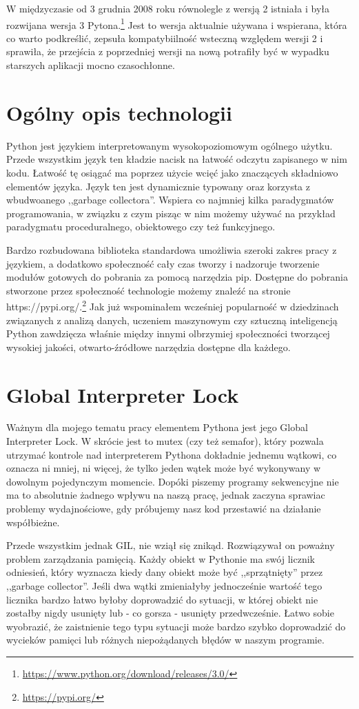 W międzyczasie od 3 grudnia 2008 roku równolegle z wersją 2 istniała i była rozwijana wersja 3 Pytona.\footnote{\url{https://www.python.org/download/releases/3.0/}} Jest to wersja aktualnie używana i wspierana, która co warto podkreślić, zepsuła kompatybiilność wsteczną względem wersji 2 i sprawiła, że przejścia z poprzedniej wersji na nową potrafiły być w wypadku starszych aplikacji mocno czasochłonne. 

\section{Ogólny opis technologii}
Python jest językiem interpretowanym wysokopoziomowym ogólnego użytku. Przede wszystkim język ten kładzie nacisk na łatwość odczytu zapisanego w nim kodu. Łatwość tę osiągać ma poprzez użycie wcięć jako znaczących składniowo elementów języka.  Język ten jest dynamicznie typowany oraz korzysta z wbudwoanego ,,garbage collectora''. Wspiera co najmniej kilka paradygmatów programowania, w związku z czym pisząc w nim możemy używać na przykład paradygmatu proceduralnego, obiektowego czy też funkcyjnego.

Bardzo rozbudowana biblioteka standardowa umożliwia szeroki zakres pracy z językiem, a dodatkowo społeczność cały czas tworzy i nadzoruje tworzenie modułów gotowych do pobrania za pomocą narzędzia pip. Dostępne do pobrania stworzone przez społeczność technologie możemy znaleźć na stronie https://pypi.org/.\footnote{\url{https://pypi.org/}} Jak już wspominałem wcześniej popularność w dziedzinach związanych z analizą danych, uczeniem maszynowym czy sztuczną inteligencją Python zawdzięcza właśnie między innymi olbrzymiej społeczności tworzącej wysokiej jakości, otwarto-źródłowe narzędzia dostępne dla każdego.

\section{Global Interpreter Lock}
Ważnym dla mojego tematu pracy elementem Pythona jest jego Global Interpreter Lock. W skrócie jest to mutex (czy też semafor), który pozwala utrzymać kontrole nad interpreterem Pythona dokładnie jednemu wątkowi, co oznacza ni mniej, ni więcej, że tylko jeden wątek może być wykonywany w dowolnym pojedynczym momencie. Dopóki piszemy programy sekwencyjne nie ma to absolutnie żadnego wpływu na naszą pracę, jednak zaczyna sprawiac problemy wydajnościowe, gdy próbujemy nasz kod przestawić na działanie współbieżne.

Przede wszystkim jednak GIL, nie wziął się znikąd. Rozwiązywał on poważny problem zarządzania pamięcią. Każdy obiekt w Pythonie ma swój licznik odniesień, który wyznacza kiedy dany obiekt może być ,,sprzątnięty'' przez ,,garbage collector''. Jeśli dwa wątki zmieniałyby jednocześnie wartość tego licznika bardzo łatwo byłoby doprowadzić do sytuacji, w której obiekt nie zostałby nigdy usunięty lub - co gorsza - usunięty przedwcześnie. Łatwo sobie wyobrazić, że zaistnienie tego typu sytuacji może bardzo szybko doprowadzić do wycieków pamięci lub różnych niepożądanych błędów w naszym programie.

